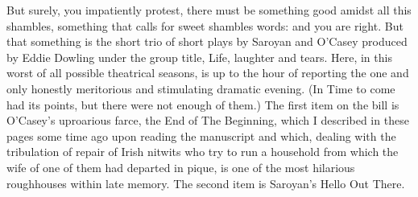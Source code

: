 \def\day{24. November 1942 *}
\mktitle

But surely, you impatiently protest, there must be something good amidst all this shambles, something that calls for sweet shambles words: and you are right.
But that something is the short trio of short plays by Saroyan and O'Casey produced by Eddie Dowling under the group title, Life, laughter and tears.
Here, in this worst of all possible theatrical seasons, is up to the hour of reporting the one and only honestly meritorious and stimulating dramatic evening.
(In Time to come had its points, but there were not enough of them.)
The first item on the bill is O'Casey's uproarious farce, the End of The Beginning, which I described in these pages some time ago upon reading the manuscript and which, dealing with the tribulation of repair of Irish nitwits who try to run a household from which the wife of one of them had departed in pique, is one of the most hilarious roughhouses within late memory.
The second item is Saroyan's Hello Out There.

\clearpage
